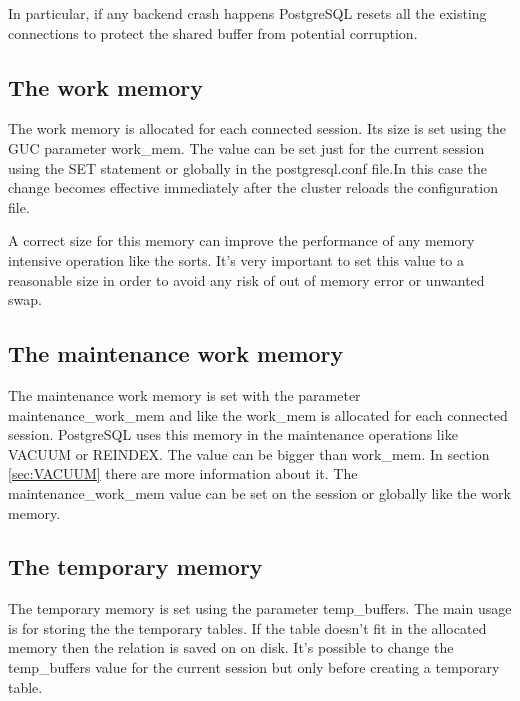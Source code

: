 In particular, if any backend crash happens PostgreSQL resets all the existing
connections to protect the shared buffer from potential corruption.

\subsection{The work memory}

\label{sub:WORKMEM}

The work memory is allocated for each connected session. Its size is set using
the GUC parameter work\_mem. The value can be set just for the current session
using the SET statement or globally in the postgresql.conf file.In this case
the change becomes effective immediately after the cluster reloads the
configuration file.\newline

A correct size for this memory can improve the performance of any memory
intensive operation like the sorts. It's very important to set this value to a
reasonable size in order to avoid any risk of out of memory error or unwanted
swap.\newline

\subsection{The maintenance work memory}

The maintenance work memory is set with the parameter maintenance\_work\_mem
and like the work\_mem is allocated for each connected session. PostgreSQL uses
this memory in the maintenance operations like VACUUM or REINDEX. The value can
be bigger than work\_mem. In section \ref{sec:VACUUM} there are more
information about it. The maintenance\_work\_mem value can be set on the
session or globally like the work memory.

\subsection{The temporary memory}

\label{sub:TEMPBUF}

The temporary memory is set using the parameter temp\_buffers. The main usage
is for storing the the temporary tables. If the table doesn't fit in the
allocated memory then the relation is saved on on disk. It's possible to change
the temp\_buffers value for the current session but only before creating a
temporary table.

